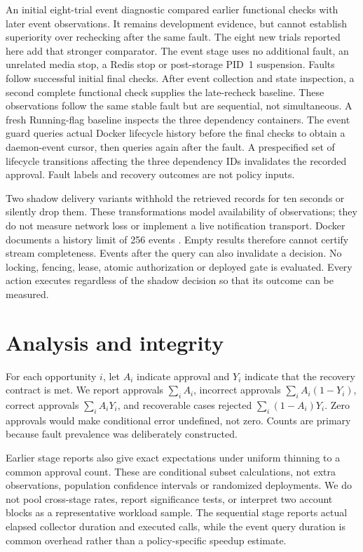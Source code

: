\documentclass[11pt]{article}
\begin{document}
An initial eight-trial event diagnostic compared earlier functional checks with later event observations. It remains development evidence, but cannot establish superiority over rechecking after the same fault. The eight new trials reported here add that stronger comparator. The event stage uses no additional fault, an unrelated media stop, a Redis stop or post-storage PID~1 suspension. Faults follow successful initial final checks. After event collection and state inspection, a second complete functional check supplies the late-recheck baseline. These observations follow the same stable fault but are sequential, not simultaneous. A fresh Running-flag baseline inspects the three dependency containers. The event guard queries actual Docker lifecycle history before the final checks to obtain a daemon-event cursor, then queries again after the fault. A prespecified set of lifecycle transitions affecting the three dependency IDs invalidates the recorded approval. Fault labels and recovery outcomes are not policy inputs.

Two shadow delivery variants withhold the retrieved records for ten seconds or silently drop them. These transformations model availability of observations; they do not measure network loss or implement a live notification transport. Docker documents a history limit of 256 events \cite{docker}. Empty results therefore cannot certify stream completeness. Events after the query can also invalidate a decision. No locking, fencing, lease, atomic authorization or deployed gate is evaluated. Every action executes regardless of the shadow decision so that its outcome can be measured.

\section{Analysis and integrity}
For each opportunity $i$, let $A_i$ indicate approval and $Y_i$ indicate that the recovery contract is met. We report approvals $\sum_i A_i$, incorrect approvals $\sum_i A_i(1-Y_i)$, correct approvals $\sum_i A_iY_i$, and recoverable cases rejected $\sum_i(1-A_i)Y_i$. Zero approvals would make conditional error undefined, not zero. Counts are primary because fault prevalence was deliberately constructed.

Earlier stage reports also give exact expectations under uniform thinning to a common approval count. These are conditional subset calculations, not extra observations, population confidence intervals or randomized deployments. We do not pool cross-stage rates, report significance tests, or interpret two account blocks as a representative workload sample. The sequential stage reports actual elapsed collector duration and executed calls, while the event query duration is common overhead rather than a policy-specific speedup estimate.
\end{document}
